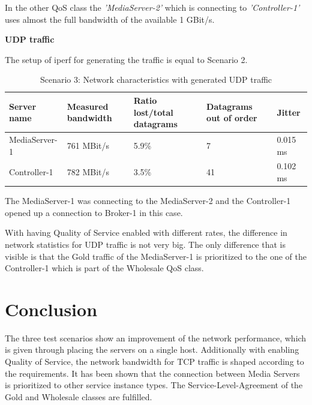 In the other QoS class the \textit{'MediaServer-2'} which is connecting to \textit{'Controller-1'} uses almost the full bandwidth of the available 1 GBit/s.

\textbf{UDP traffic}

The setup of iperf for generating the traffic is equal to Scenario 2.

\begin{table}[H]
\centering

\begin{tabularx}{\textwidth}{ |X|X|X|X|X| }
\hline Server name & Measured bandwidth & Ratio lost/total datagrams & Datagrams out of order & Jitter \\ 
\hline MediaServer-1 & 761 MBit/s & 5.9\% & 7 & 0.015 ms\\ 
\hline Controller-1 & 782 MBit/s & 3.5\% & 41 & 0.102 ms \\ 
\hline 
\end{tabularx}

\caption{Scenario 3: Network characteristics with generated UDP traffic}
\end{table}

The MediaServer-1 was connecting to the MediaServer-2 and the Controller-1 opened up a connection to Broker-1 in this case.

With having Quality of Service enabled with different rates, the difference in network statistics for UDP traffic is not very big. The only difference that is visible is that the Gold traffic of the MediaServer-1 is prioritized to the one of the Controller-1 which is part of the Wholesale QoS class.



\section{Conclusion}

The three test scenarios show an improvement of the network performance, which is given through placing the servers on a single host. Additionally with enabling Quality of Service, the network bandwidth for TCP traffic is shaped according to the requirements. It has been shown that the connection between Media Servers is prioritized to other service instance types. The Service-Level-Agreement of the Gold and Wholesale classes are fulfilled.